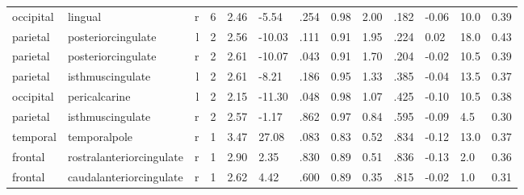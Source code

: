 \documentclass{article}
\begin{document}
\begin{longtable}{llrR{1.5cm}R{1cm}R{1.3cm}R{1cm}R{1cm}R{1.3cm}R{1cm}R{1.8cm}R{1.3cm}R{1.8cm}}
 occipital &                   lingual &    r &            6 &                  2.46 &            -5.54 &               .254 &                               0.98 &                          2.00 &                            .182 & -0.06 &   10.0 &      0.39 \\
  parietal &        posteriorcingulate &    l &            2 &                  2.56 &           -10.03 &               .111 &                               0.91 &                          1.95 &                            .224 &  0.02 &   18.0 &      0.43 \\
  parietal &        posteriorcingulate &    r &            2 &                  2.61 &           -10.07 &               .043 &                               0.91 &                          1.70 &                            .204 & -0.02 &   10.5 &      0.39 \\
  parietal &          isthmuscingulate &    l &            2 &                  2.61 &            -8.21 &               .186 &                               0.95 &                          1.33 &                            .385 & -0.04 &   13.5 &      0.37 \\
 occipital &             pericalcarine &    l &            2 &                  2.15 &           -11.30 &               .048 &                               0.98 &                          1.07 &                            .425 & -0.10 &   10.5 &      0.38 \\
  parietal &          isthmuscingulate &    r &            2 &                  2.57 &            -1.17 &               .862 &                               0.97 &                          0.84 &                            .595 & -0.09 &    4.5 &      0.30 \\
  temporal &              temporalpole &    r &            1 &                  3.47 &            27.08 &               .083 &                               0.83 &                          0.52 &                            .834 & -0.12 &   13.0 &      0.37 \\
   frontal &  rostralanteriorcingulate &    r &            1 &                  2.90 &             2.35 &               .830 &                               0.89 &                          0.51 &                            .836 & -0.13 &    2.0 &      0.36 \\
   frontal &   caudalanteriorcingulate &    r &            1 &                  2.62 &             4.42 &               .600 &                               0.89 &                          0.35 &                            .815 & -0.02 &    1.0 &      0.31 \\

\end{longtable}
\end{document}
